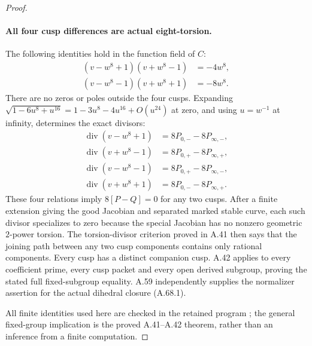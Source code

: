 \begin{proof}
\paragraph{All four cusp differences are actual eight-torsion.}
The following identities hold in the function field of \(C\):
\[
 \begin{split}
 (v-w^8+1)(v+w^8-1)&=-4w^8,\\
 (v-w^8-1)(v+w^8+1)&=-8w^8.
 \end{split}                                                   \tag{A.68.11}
\]
There are no zeros or poles outside the four cusps. Expanding
\(\sqrt{1-6u^8+u^{16}}=1-3u^8-4u^{16}+O(u^{24})\) at zero,
and using \(u=w^{-1}\) at infinity, determines the exact divisors:
\[
 \begin{split}
 \operatorname{div}(v-w^8+1)&=8P_{0,-}-8P_{\infty,-},\\
 \operatorname{div}(v+w^8-1)&=8P_{0,+}-8P_{\infty,+},\\
 \operatorname{div}(v-w^8-1)&=8P_{0,+}-8P_{\infty,-},\\
 \operatorname{div}(v+w^8+1)&=8P_{0,-}-8P_{\infty,+}.
 \end{split}                                                   \tag{A.68.12}
\]
These four relations imply \(8[P-Q]=0\) for any two cusps.
After a finite extension giving the good Jacobian and separated
marked stable curve, each such divisor specializes to zero because
the special Jacobian has no nonzero geometric \(2\)-power torsion.
The torsion-divisor criterion proved in A.41 then says that the
joining path between any two cusp components contains only rational
components. Every cusp has a distinct companion cusp. A.42 applies
to every coefficient prime, every cusp packet and every open derived
subgroup, proving the stated full fixed-subgroup equality. A.59
independently supplies the normalizer assertion for the actual
dihedral closure (A.68.1).

All finite identities used here are checked in the retained program
; the general
fixed-group implication is the proved A.41--A.42 theorem, rather than
an inference from a finite computation.
\end{proof}
